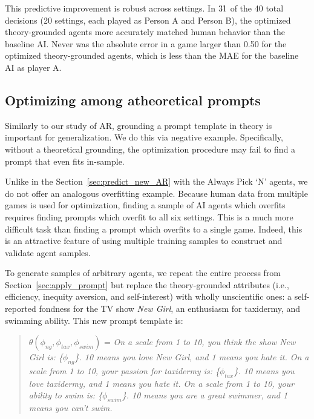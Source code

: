 \documentclass[11pt]{article}
\theoremstyle{definition}
\newcommand{\aisub}{AI agent}
\newcommand{\persona}{prompt}
\begin{document}
This predictive improvement is robust across settings.
In $31$ of the 40 total decisions (20 settings, each played as Person A and Person B), the optimized theory-grounded agents more accurately matched human behavior than the baseline AI. 
Never was the absolute error in a game larger than 0.50 for the optimized theory-grounded agents, which is less than the MAE for the baseline AI as player A.

\subsection{Optimizing among atheoretical \persona{s}}
\label{sec:atheory_prompt}

Similarly to our study of AR, grounding a \persona{} template in theory is important for generalization.
We do this via negative example.
Specifically, without a theoretical grounding, the optimization procedure may fail to find a \persona{} that even fits in-sample.

Unlike in the Section~\ref{sec:predict_new_AR} with the Always Pick `N' agents, we do not offer an analogous overfitting example.
Because human data from multiple games is used for optimization, finding a sample of \aisub{s} which overfits requires finding \persona{s} which overfit to all six settings.
This is a much more difficult task than finding a \persona{} which overfits to a single game.
Indeed, this is an attractive feature of using multiple training samples to construct and validate agent samples.

To generate samples of arbitrary agents, we repeat the entire process from Section~\ref{sec:apply_prompt} but replace the theory-grounded attributes (i.e., efficiency, inequity aversion, and self-interest) with wholly unscientific ones: a self-reported fondness for the TV show \emph{New Girl}, an enthusiasm for taxidermy, and swimming ability.  
This new prompt template is:
\begin{quote}
\vspace{-.5cm}
\singlespacing
$\theta(\phi_{ng}, \phi_{tax}, \phi_{swim})$ = \textit{On a scale from 1 to 10, you think the show New Girl is: \{$\phi_{ng}$\}.
10 means you love New Girl, and 1 means you hate it.
On a scale from 1 to 10, your passion for taxidermy is: \{\(\phi_{tax}\)\}.
10 means you love taxidermy, and 1 means you hate it.
On a scale from 1 to 10, your ability to swim is: \{\(\phi_{swim}\)\}.
10 means you are a great swimmer, and 1 means you can't swim.}
\end{quote}
\end{document}
